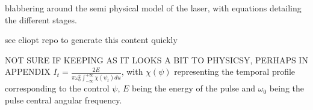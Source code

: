 blabbering around the semi physical model of the laser, with equations detailing the different stages.

see eliopt repo to generate this content quickly

NOT SURE IF KEEPING AS IT LOOKS A BIT TO PHYSICSY, PERHAPS IN APPENDIX $I_t = \frac{2E}{\pi \omega_0^2 \int_{-\infty}^{+\infty} \chi(\psi_t) du}$, with $\chi(\psi)$ representing the temporal profile corresponding to the control $\psi$, $E$ being the energy of the pulse and $\omega_0$ being the pulse central angular frequency.